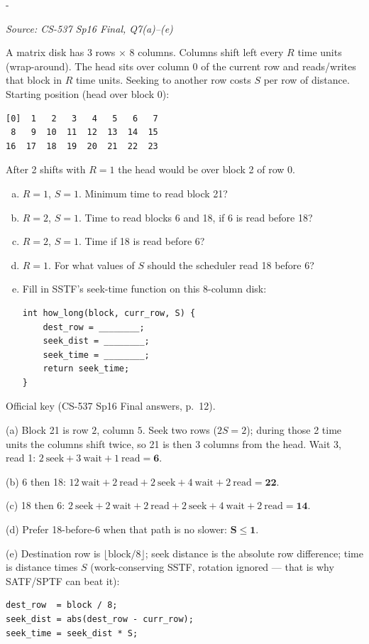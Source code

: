 \documentclass[11pt,a4paper]{article}
\makeatletter
\newcommand{\keepspace}[1]{\par\penalty-100\begingroup
  \setlength{\dimen@}{#1}\dimen@ii\pagegoal\advance\dimen@ii-\pagetotal
  \ifdim\dimen@>\dimen@ii\ifdim\dimen@ii>\z@\vfil\fi\break\fi\endgroup}
\newcounter{qn}[section]
\newenvironment{Qn}[4]{%
  \refstepcounter{qn}\keepspace{7\baselineskip}%
  \begin{tcolorbox}[qboxstyle, title={Q\thesection.\theqn\ \ [#1 \textbar\ #2]\ \ #4}]%
  {\footnotesize\color{g3}\textit{Source: #3}}\par\smallskip%
}{%
  \end{tcolorbox}%
}
\newenvironment{Sol}{%
  \begin{tcolorbox}[sboxstyle, title={Solution}]%
}{%
  \end{tcolorbox}\vspace{0.35em}%
}
\makeatother
\begin{document}
\begin{Qn}{Hard}{Lect 22}{CS-537 Sp16 Final, Q7(a)--(e)}{SSTF on a rotating ``matrix disk''}
A matrix disk has 3 rows $\times$ 8 columns. Columns shift left every
$R$ time units (wrap-around). The head sits over column 0 of the
current row and reads/writes that block in $R$ time units. Seeking to
another row costs $S$ per row of distance. Starting position (head over
block 0):
\begin{lstlisting}[numbers=none]
[0]  1   2   3   4   5   6   7
 8   9  10  11  12  13  14  15
16  17  18  19  20  21  22  23
\end{lstlisting}
After 2 shifts with $R=1$ the head would be over block 2 of row 0.
\begin{enumerate}[(a)]
\item $R=1$, $S=1$. Minimum time to read block 21?
\item $R=2$, $S=1$. Time to read blocks 6 and 18, if 6 is read before 18?
\item $R=2$, $S=1$. Time if 18 is read before 6?
\item $R=1$. For what values of $S$ should the scheduler read 18 before 6?
\item Fill in SSTF's seek-time function on this 8-column disk:
\begin{lstlisting}[numbers=none]
int how_long(block, curr_row, S) {
    dest_row = ________;
    seek_dist = ________;
    seek_time = ________;
    return seek_time;
}
\end{lstlisting}
\end{enumerate}
\end{Qn}
\begin{Sol}
Official key (CS-537 Sp16 Final answers, p.~12).

(a) Block 21 is row $2$, column $5$. Seek two rows ($2S=2$); during
those 2 time units the columns shift twice, so 21 is then 3 columns
from the head. Wait 3, read 1:
$2~\mathrm{seek}+3~\mathrm{wait}+1~\mathrm{read}=\mathbf{6}$.

(b) 6 then 18:
$12~\mathrm{wait}+2~\mathrm{read}+2~\mathrm{seek}+4~\mathrm{wait}+2~\mathrm{read}
=\mathbf{22}$.

(c) 18 then 6:
$2~\mathrm{seek}+2~\mathrm{wait}+2~\mathrm{read}+2~\mathrm{seek}+4~\mathrm{wait}+2~\mathrm{read}
=\mathbf{14}$.

(d) Prefer 18-before-6 when that path is no slower:
$\boldsymbol{S\le 1}$.

(e) Destination row is $\lfloor\mathrm{block}/8\rfloor$; seek distance
is the absolute row difference; time is distance times $S$
(work-conserving SSTF, rotation ignored --- that is why SATF/SPTF can
beat it):
\begin{lstlisting}[numbers=none]
dest_row  = block / 8;
seek_dist = abs(dest_row - curr_row);
seek_time = seek_dist * S;
\end{lstlisting}
\end{Sol}
\end{document}
